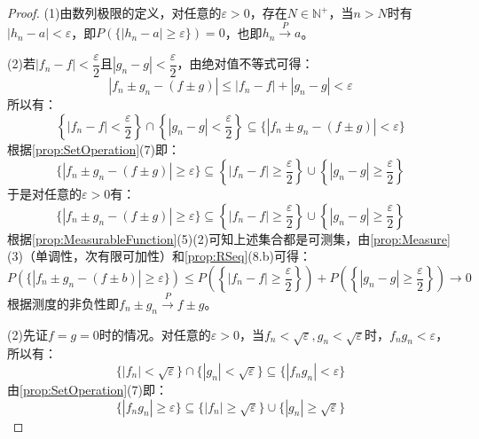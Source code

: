 \begin{proof}
	(1)由数列极限的定义，对任意的$\varepsilon>0$，存在$N\in\mathbb{N}^+$，当$n>N$时有$|h_n-a|<\varepsilon$，即$P(\{|h_n-a|\geqslant\varepsilon\})=0$，也即$h_n\overset{P}{\longrightarrow}a$。\par
	(2)若$|f_n-f|<\dfrac{\varepsilon}{2}$且$|g_n-g|<\dfrac{\varepsilon}{2}$，由绝对值不等式可得：
	\begin{equation*}
		|f_n\pm g_n-(f\pm g)|\leqslant|f_n-f|+|g_n-g|<\varepsilon
	\end{equation*}
	所以有：
	\begin{equation*}
		\left\{|f_n-f|<\frac{\varepsilon}{2}\right\}\cap\left\{|g_n-g|<\frac{\varepsilon}{2}\right\}\subseteq\{|f_n\pm g_n-(f\pm g)|<\varepsilon\}
	\end{equation*}
	根据\cref{prop:SetOperation}(7)即：
	\begin{equation*}
		\{|f_n\pm g_n-(f\pm g)|\geqslant\varepsilon\}\subseteq\left\{|f_n-f|\geqslant\frac{\varepsilon}{2}\right\}\cup\left\{|g_n-g|\geqslant\frac{\varepsilon}{2}\right\}
	\end{equation*}
	于是对任意的$\varepsilon>0$有：
	\begin{equation*}
		\{|f_n\pm g_n-(f\pm g)|\geqslant\varepsilon\}\subseteq\left\{|f_n-f|\geqslant\frac{\varepsilon}{2}\right\}\cup\left\{|g_n-g|\geqslant\frac{\varepsilon}{2}\right\}
	\end{equation*}
	根据\cref{prop:MeasurableFunction}(5)(2)可知上述集合都是可测集，由\cref{prop:Measure}(3)（单调性，次有限可加性）和\cref{prop:RSeq}(8.b)可得：
	\begin{equation*}
		P(\{|f_n\pm g_n-(f\pm b)|\geqslant\varepsilon\})\leqslant P\left(\left\{|f_n-f|\geqslant\frac{\varepsilon}{2}\right\}\right)+P\left(\left\{|g_n-g|\geqslant\frac{\varepsilon}{2}\right\}\right)\to0
	\end{equation*}
	根据测度的非负性即$f_n\pm g_n\overset{P}{\longrightarrow}f\pm g$。\par
	(2)先证$f=g=0$时的情况。对任意的$\varepsilon>0$，当$f_n<\sqrt{\varepsilon},g_n<\sqrt{\varepsilon}$时，$f_ng_n<\varepsilon$，所以有：
	\begin{equation*}
		\{|f_n|<\sqrt{\varepsilon}\}\cap\{|g_n|<\sqrt{\varepsilon}\}\subseteq\{|f_ng_n|<\varepsilon\}
	\end{equation*}
	由\cref{prop:SetOperation}(7)即：
	\begin{equation*}
		\{|f_ng_n|\geqslant\varepsilon\}\subseteq\{|f_n|\geqslant\sqrt{\varepsilon}\}\cup\{|g_n|\geqslant\sqrt{\varepsilon}\}
	\end{equation*}

\end{proof}
